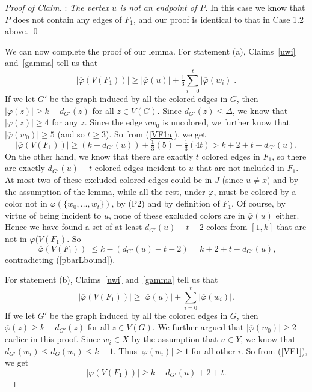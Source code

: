 \documentclass[10pt,a4paper]{amsart}
\newcommand{\pbar}{\overline{\varphi}}
\newenvironment{proofc}{\begin{proof}[Proof of Claim]}{\end{proof}}
\begin{document}
\begin{proofc}
:  \emph{The vertex $u$ is not an endpoint of $P$.}   
In this case we know that $P$ does not contain any edges of $F_1$, and our proof is identical to that in Case 1.2 above. 
\qed

\vspace*{.2in}

We can now complete the proof of our lemma. For statement (a), Claims~\ref{uwi} and~\ref{gamma} tell us that
\begin{equation}\label{VF1a}
	|\pbar(V(F_1))|  \ge  |\pbar(u)|+ \tfrac{1}{3}\sum_{i=0}^t|\pbar(w_i)|.
\end{equation}
If we let $G'$ be the graph induced by all the colored edges in $G$, then $|\pbar(z)|\geq k-d_{G'}(z)$ for all $z\in V(G)$. Since $d_{G'}(z)\leq \Delta$, we know that $|\pbar(z)|\geq 4$ for any $z$. Since the edge $uw_0$ is uncolored, we further know that $|\pbar(w_0)|\geq 5$ (and so $t\ge 3$). So from (\ref{VF1a}), we get
\begin{equation}\label{pbarLbound}
|\pbar(V(F_1))|  \ge  (k-d_{G'}(u))+ \tfrac{1}{3}(5)+ \tfrac{1}{3}(4t)>k+2+t-d_{G'}(u).
\end{equation}
On the other hand, we know that there are exactly $t$ colored edges in $F_1$,  so there are exactly $d_{G'}(u)-t$ colored edges incident to $u$ that are not included in $F_1$. At most two of these excluded colored edges could be in $J$ (since $u\neq x$) and by the assumption of the lemma, while all the rest,     under $\varphi$,  must be colored by a color not in $\pbar(\{w_0, \ldots, w_t\})$, by (P2) and by definition of $F_1$. Of course, by virtue of being incident to $u$, none of these excluded colors are in $\pbar(u)$ either. Hence we have found a set of at least $d_{G'}(u)-t-2$ colors from $[1,k]$ that are not in $\pbar(V(F_1)$. So
$$|\pbar(V(F_1))| \leq k-(d_{G'}(u)-t-2)=k+2+t-d_{G'}(u),$$
contradicting (\ref{pbarLbound}).

For statement (b),
Claims~\ref{uwi} and~\ref{gamma} tell us that
\begin{equation}\label{VF1}
	|\pbar(V(F_1))|  \ge  |\pbar(u)|+ \sum_{i=0}^t|\pbar(w_i)|. 
\end{equation}
If we let $G'$ be the graph induced by all the colored edges in $G$, then $\pbar(z)\geq k-d_{G'}(z)$ for all $z\in V(G)$. 
We further argued that $|\pbar(w_0)|\geq 2$ earlier in this proof. Since $w_i\in X$ by the assumption that $u\in Y$, we know that $d_{G'}(w_i) \le d_G(w_i) \le k-1$. Thus $|\pbar(w_i)|\geq 1$ for all other $i$. So from (\ref{VF1}), we get
\begin{equation}\label{pbarLbound1}
	|\pbar(V(F_1))|  \ge k-d_{G'}(u)+ 2+ t.
\end{equation}



\end{proofc}
\end{document}
